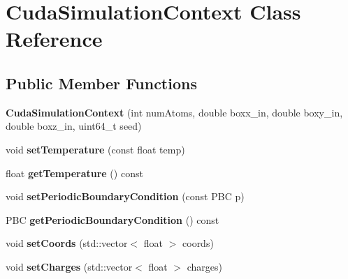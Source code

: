 \hypertarget{classCudaSimulationContext}{}\section{Cuda\+Simulation\+Context Class Reference}
\label{classCudaSimulationContext}
\subsection*{Public Member Functions}
\begin{DoxyCompactItemize}
\item 
\hypertarget{classCudaSimulationContext_abb111e766ea4f2f5c26434909ff42684}{}\label{classCudaSimulationContext_abb111e766ea4f2f5c26434909ff42684} 
{\bfseries Cuda\+Simulation\+Context} (int num\+Atoms, double boxx\+\_\+in, double boxy\+\_\+in, double boxz\+\_\+in, uint64\+\_\+t seed)
\item 
\hypertarget{classCudaSimulationContext_ab0b762b45d6076be96bf3dd38ed1db70}{}\label{classCudaSimulationContext_ab0b762b45d6076be96bf3dd38ed1db70} 
void {\bfseries set\+Temperature} (const float temp)
\item 
\hypertarget{classCudaSimulationContext_a64a1d00b6efac2e9cde3b26923a2069c}{}\label{classCudaSimulationContext_a64a1d00b6efac2e9cde3b26923a2069c} 
float {\bfseries get\+Temperature} () const
\item 
\hypertarget{classCudaSimulationContext_a92681840f8841ae2b45566a85156efdd}{}\label{classCudaSimulationContext_a92681840f8841ae2b45566a85156efdd} 
void {\bfseries set\+Periodic\+Boundary\+Condition} (const P\+BC p)
\item 
\hypertarget{classCudaSimulationContext_aad2699c729bfbcc8c51fff0ed6745c2a}{}\label{classCudaSimulationContext_aad2699c729bfbcc8c51fff0ed6745c2a} 
P\+BC {\bfseries get\+Periodic\+Boundary\+Condition} () const
\item 
\hypertarget{classCudaSimulationContext_a3e7a34c3fd6f3fc0a4d53dd47ab43cd0}{}\label{classCudaSimulationContext_a3e7a34c3fd6f3fc0a4d53dd47ab43cd0} 
void {\bfseries set\+Coords} (std\+::vector$<$ float $>$ coords)
\item 
\hypertarget{classCudaSimulationContext_abcf10ad20bcfb62a1239b2f46f208e22}{}\label{classCudaSimulationContext_abcf10ad20bcfb62a1239b2f46f208e22} 
void {\bfseries set\+Charges} (std\+::vector$<$ float $>$ charges)
\item 
\hypertarget{classCudaSimulationContext_a16ac6180e3670440f97beeabd4baa350}{}\label{classCudaSimulationContext_a16ac6180e3670440f97beeabd4baa350} 

\end{DoxyCompactItemize}
